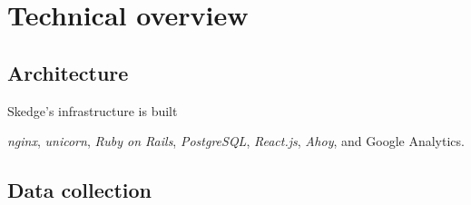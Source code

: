 
\chapter{Technical overview}

\section{Architecture}

Skedge's infrastructure is built 

\emph{nginx}, \emph{unicorn}, \emph{Ruby on Rails}, \emph{PostgreSQL}, \emph{React.js}, \emph{Ahoy}, and Google Analytics.

\section{Data collection}